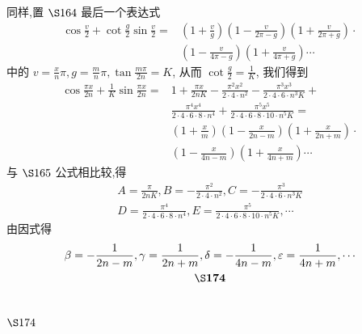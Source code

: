 同样,置 $\S 164$ 最后一个表达式
\[
\begin{aligned}
\cos \frac{v}{2}+\cot \frac{g}{2} \sin \frac{v}{2}= & \left(1+\frac{v}{g}\right)\left(1-\frac{v}{2 \pi-g}\right)\left(1+\frac{v}{2 \pi+g}\right) \cdot \\
& \left(1-\frac{v}{4 \pi-g}\right)\left(1+\frac{v}{4 \pi+g}\right) \cdots
\end{aligned}
\]
中的 $v=\frac{x}{n} \pi, g=\frac{m}{n} \pi, \tan \frac{m \pi}{2 n}=K$, 从而 $\cot \frac{g}{2}=\frac{1}{K}$, 我们得到
\[
\begin{aligned}
\cos \frac{\pi x}{2 n}+\frac{1}{K} \sin \frac{\pi x}{2 n}= & 1+\frac{\pi x}{2 n K}-\frac{\pi^{2} x^{2}}{2 \cdot 4 \cdot n^{2}}-\frac{\pi^{3} x^{3}}{2 \cdot 4 \cdot 6 \cdot n^{3} K}+ \\
& \frac{\pi^{4} x^{4}}{2 \cdot 4 \cdot 6 \cdot 8 \cdot n^{4}}+\frac{\pi^{5} x^{5}}{2 \cdot 4 \cdot 6 \cdot 8 \cdot 10 \cdot n^{5} K}= \\
& \left(1+\frac{x}{m}\right)\left(1-\frac{x}{2 n-m}\right)\left(1+\frac{x}{2 n+m}\right) \cdot \\
& \left(1-\frac{x}{4 n-m}\right)\left(1+\frac{x}{4 n+m}\right) \cdots
\end{aligned}
\]
与 $\S 165$ 公式相比较,得
\[
\begin{gathered}
A=\frac{\pi}{2 n K}, B=-\frac{\pi^{2}}{2 \cdot 4 \cdot n^{2}}, C=-\frac{\pi^{3}}{2 \cdot 4 \cdot 6 \cdot n^{3} K} \\
D=\frac{\pi^{4}}{2 \cdot 4 \cdot 6 \cdot 8 \cdot n^{4}}, E=\frac{\pi^{5}}{2 \cdot 4 \cdot 6 \cdot 8 \cdot 10 \cdot n^{5} K}, \cdots
\end{gathered}
\]
由因式得 
\[
\begin{gathered}
\beta=-\frac{1}{2 n-m}, \gamma=\frac{1}{2 n+m}, \delta=-\frac{1}{4 n-m}, \varepsilon=\frac{1}{4 n+m}, \cdots \\
\S \mathbf{1 7 4}
\end{gathered}
\]
\section{$\S 174$}

